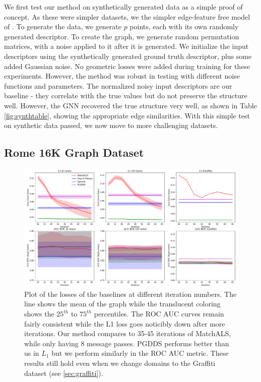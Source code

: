 \documentclass{article} %
\begin{document}
We first test our method on synthetically generated data as a simple proof of concept.
As these were simpler datasets, we the simpler edge-feature free model of \citep{kipf2017semi}.
To generate the data, we generate $p$ points, each with its own randomly generated descriptor.
To create the graph, we generate random permutation matrices, with a noise applied to it after it is generated.
We initialize the input descriptors using the synthetically generated ground truth descriptor, plus some added Gaussian noise.
No geometric losses were added during training for these experiments.
However, the method was robust in testing with different noise functions and parameters.
The normalized noisy input descriptors are our baseline - they correlate with the true values but do not preserve the structure well.
However, the GNN recovered the true structure very well, as shown in Table \ref{fig:synthtable}, showing the appropriate edge similarities.
With this simple test on synthetic data passed, we now move to more challenging datasets.

\subsection{Rome 16K Graph Dataset}

\begin{figure}[t]
\centering
\includegraphics[width=0.95\linewidth]{figures-error_lines.pdf}
\caption{
  Plot of the losses of the baselines at different iteration numbers.
  The line shows the mean of the graph while the translucent coloring shows the $25^{th}$ to $75^{th}$ percentiles.
  The ROC AUC curves remain fairly consistent while the L1 loss goes noticibly down after more iterations.
  Our method compares to 35-45 iterations of MatchALS, while only having 8 message passes.
  PGDDS performs better than us in $L_1$ but we perform similarly in the ROC AUC metric.
  These results still hold even when we change domains to the Graffiti dataset (see \ref{sec:graffiti}).
}
\label{fig:3}
\label{fig:errorlines}
\end{figure}
\end{document}
